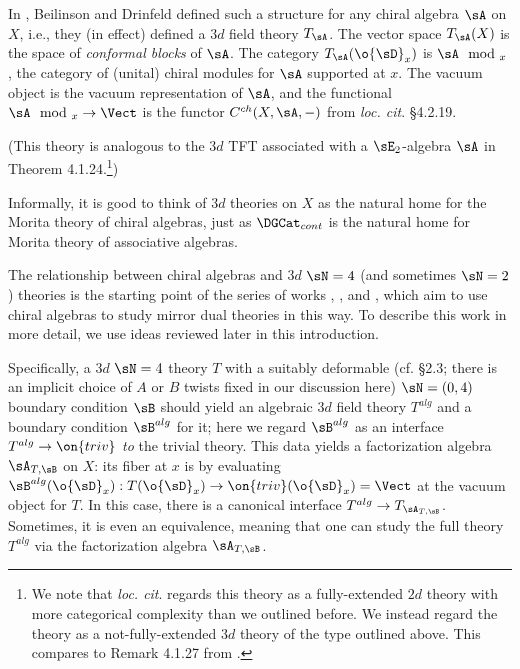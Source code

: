 \begin{example}
\notready\label{e:3d-chiral}

In \cite{chiral}, Beilinson and Drinfeld defined such a structure
for any chiral algebra $\sA$ on $X$, i.e., they (in effect)
defined a $3d$ field theory $T_{\sA}$.
The vector space $T_{\sA}(X)$ is the
space of \emph{conformal blocks} of $\sA$. The category
$T_{\sA}(\o{\sD}_x)$ is $\sA\mod_x$, the category of (unital) chiral
modules for $\sA$ supported at $x$. The vacuum object is the
vacuum representation of $\sA$, and the functional
$\sA\mod_x \to \Vect$ is the functor $C^{ch}(X,\sA,-)$ from
\emph{loc. cit}. \S 4.2.19.

(This theory is analogous to the $3d$ TFT associated
with a $\sE_2$-algebra $\sA$ in
\cite{lurie-tft} Theorem 4.1.24.\footnote{We
note that \emph{loc. cit}. regards this theory as a fully-extended
$2d$ theory with more categorical complexity than we outlined
before. We instead regard the theory as a not-fully-extended
$3d$ theory of the type outlined above.
This compares to Remark 4.1.27 from \cite{lurie-tft}.})

\end{example}

\begin{rem}
\notready

Informally, it is good to think of $3d$ theories on $X$ as
the natural home for the Morita theory of chiral algebras,
just as $\DGCat_{cont}$ is the natural home for Morita theory of
associative algebras.

\end{rem}

\begin{rem}
\notready\label{r:voa-3d}

The relationship between chiral algebras and $3d$ $\sN = 4$ (and
sometimes $\sN = 2$) theories is the starting point of the series of
works \cite{voa-3d}, \cite{ccg}, and \cite{cdg}, which aim to use
chiral algebras to
study mirror dual theories in this way. To describe this work in more detail,
we use ideas reviewed later in this introduction.

Specifically, a $3d$ $\sN = 4$
theory $T$ with a suitably deformable
(cf. \cite{voa-3d} \S 2.3; there is an implicit
choice of $A$ or $B$ twists fixed in our discussion here)
$\sN = (0,4)$ boundary condition $\sB$ should yield an
algebraic $3d$ field theory $T^{alg}$
and a boundary condition $\sB^{alg}$ for it; here
we regard $\sB^{alg}$ as an interface $T^{alg} \to \on{triv}$
\emph{to} the trivial theory.
This data yields a factorization algebra $\sA_{T,\sB}$ on $X$: its fiber at $x$
is by evaluating $\sB^{alg}(\o{\sD}_x):T(\o{\sD}_x) \to \on{triv}(\o{\sD}_x) = \Vect$
at the vacuum object for $T$. In this case, there is a canonical
interface $T^{alg} \to T_{\sA_{T,\sB}}$. Sometimes, it is even an equivalence,
meaning that one can study the full theory $T^{alg}$ via the factorization
algebra $\sA_{T,\sB}$.

\end{rem}

